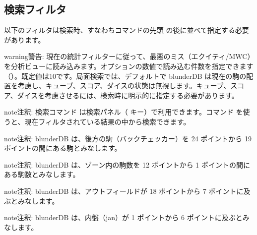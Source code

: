 \documentclass[letterpaper,10pt,dvipdfmx]{sphinxmanual}
\begin{document}
\subsection{検索フィルタ}
\label{\detokenize{cmd_mode:filtres-de-recherche}}\label{\detokenize{cmd_mode:cmd-filter}}
\sphinxAtStartPar
以下のフィルタは検索時、すなわちコマンドの先頭  の後に並べて指定する必要があります。

\label{\detokenize{cmd_mode:cmd-filter-pos}}
\begin{sphinxadmonition}{warning}{警告:}
\sphinxAtStartPar
現在の統計フィルターに従って、最悪のミス（エクイティ/MWC）を分析ビューに読み込みます。オプションの数値で読み込む件数を指定できます（）。既定値は10です。局面検索では、デフォルトで blunderDB は現在の駒の配置を考慮し、キューブ、スコア、ダイスの状態は無視します。キューブ、スコア、ダイスを考慮させるには、検索時に明示的に指定する必要があります。
\end{sphinxadmonition}

\begin{sphinxadmonition}{note}{注釈:}
\sphinxAtStartPar
検索コマンド  は検索パネル（ キー）で利用できます。コマンド  を使うと、現在フィルタされている結果の中から検索できます。
\end{sphinxadmonition}

\begin{sphinxadmonition}{note}{注釈:}
\sphinxAtStartPar
blunderDB は、後方の駒（バックチェッカー）を 24 ポイントから 19 ポイントの間にある駒とみなします。
\end{sphinxadmonition}

\begin{sphinxadmonition}{note}{注釈:}
\sphinxAtStartPar
blunderDB は、ゾーン内の駒数を 12 ポイントから 1 ポイントの間にある駒数とみなします。
\end{sphinxadmonition}

\begin{sphinxadmonition}{note}{注釈:}
\sphinxAtStartPar
blunderDB は、アウトフィールドが 18 ポイントから 7 ポイントに及ぶとみなします。
\end{sphinxadmonition}

\begin{sphinxadmonition}{note}{注釈:}
\sphinxAtStartPar
blunderDB は、内盤（jan）が 1 ポイントから 6 ポイントに及ぶとみなします。
\end{sphinxadmonition}
\end{document}
